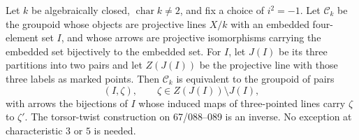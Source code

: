 \begin{theorem}\label{A5-groupoid}
Let $k$ be algebraically closed, $\operatorname{char}k\ne2$, and fix a choice of $i^2=-1$. Let $\mathcal C_k$ be the groupoid whose objects are projective lines $X/k$ with an embedded four-element set $I$, and whose arrows are projective isomorphisms carrying the embedded set bijectively to the embedded set. For $I$, let $J(I)$ be its three partitions into two pairs and let $Z(J(I))$ be the projective line with those three labels as marked points. Then $\mathcal C_k$ is equivalent to the groupoid of pairs
\[
 (I,\zeta),\qquad \zeta\in Z(J(I))\setminus J(I),
\]
with arrows the bijections of $I$ whose induced maps of three-pointed lines carry $\zeta$ to $\zeta'$. The torsor-twist construction on 67/088--089 is an inverse. No exception at characteristic $3$ or $5$ is needed.
\end{theorem}
